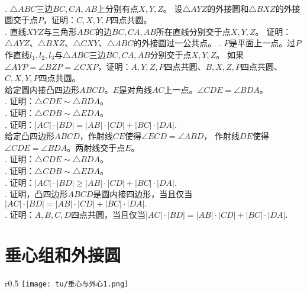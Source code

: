 \documentclass[12pt,UTF8]{ctexbook}
\begin{document}
\begin{xt}\label{xt:1-1-10}
    \mbox{}\\
    . $\triangle ABC$三边$BC,CA,AB$上分别有点$X,Y,Z$。
    设$\triangle AYZ$的外接圆和$\triangle BXZ$的外接圆交于点$P$，证明：$C,X,Y,P$四点共圆。\\
    . 直线$XYZ$与三角形$ABC$的边$BC,CA,AB$所在直线分别交于点$X,Y,Z$。
    证明：$\triangle AYZ$、$\triangle BXZ$、$\triangle CXY$、$\triangle ABC$的外接圆过一公共点。
    . $P$是平面上一点。过$P$作直线$l_1,l_2,l_3$与$\triangle ABC$三边$BC,CA,AB$分别交于点$X,Y,Z$。
    如果$\angle AYP = \angle BZP = \angle CXP$，证明：$A, Y, Z, P$四点共圆、$B, X, Z, P$四点共圆、$C,X,Y,P$四点共圆。\\
    给定圆内接凸四边形$ABCD$。$E$是对角线$AC$上一点。$\angle CDE = \angle BDA$。\\
    . 证明：$\triangle CDE \sim \triangle BDA$。\\
    . 证明：$\triangle CDB \sim \triangle EDA$。\\
    . 证明：$|AC| \cdot |BD| = |AB| \cdot |CD| + |BC| \cdot |DA|.$\\
    给定凸四边形$ABCD$，作射线$CE$使得$\angle ECD = \angle ABD$，
    作射线$DE$使得$\angle CDE = \angle BDA$。两射线交于点$E$。\\
    . 证明：$\triangle CDE \sim \triangle BDA$。\\
    . 证明：$\triangle CDB \sim \triangle EDA$。\\
    . 证明：$|AC| \cdot |BD| \geqslant |AB| \cdot |CD| + |BC| \cdot |DA|.$ \\
    . 证明，凸四边形$ABCD$是圆内接四边形，当且仅当$|AC| \cdot |BD| = |AB| \cdot |CD| + |BC| \cdot |DA|.$\\
    . 证明：$A,B,C,D$四点共圆，当且仅当$|AC| \cdot |BD| = |AB| \cdot |CD| + |BC| \cdot |DA|.$
\end{xt}

\section{垂心组和外接圆}

\begin{wrapfigure}[7]{r}{0.5\textwidth} %
    \vspace{-90pt}
    \flushright
    \texttt{[image: tu/垂心与外心1.png]}
\end{wrapfigure}
\end{document}
